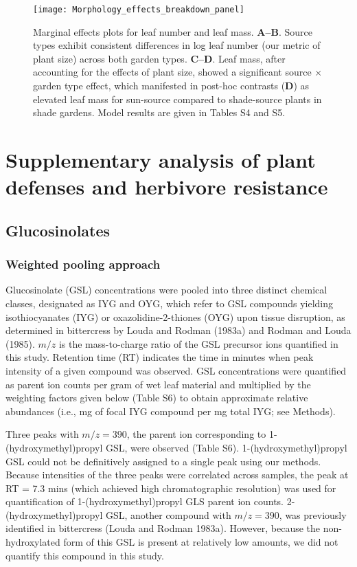\documentclass[11pt, oneside]{amsart}
\begin{document}
\begin{figure}[!htbp]
\centering
\texttt{[image: Morphology\_effects\_breakdown\_panel]}
\caption{Marginal effects plots for leaf number and leaf mass. \textbf{A--B}. Source types exhibit consistent differences in log leaf number (our metric of plant size) across both garden types. \textbf{C--D}. Leaf mass, after accounting for the effects of plant size, showed a significant source $\times$ garden type effect, which manifested in post-hoc contrasts (\textbf{D}) as elevated leaf mass for sun-source compared to shade-source plants in shade gardens. Model results are given in Tables S4 and S5.}
\label{FigS8}
\end{figure}

\clearpage

\section{Supplementary analysis of plant defenses and herbivore resistance}
\subsection{Glucosinolates}
\subsubsection{Weighted pooling approach}
Glucosinolate (GSL) concentrations were pooled into three distinct chemical classes, designated as IYG and OYG, which refer to GSL compounds yielding isothiocyanates (IYG) or oxazolidine-2-thiones (OYG) upon tissue disruption, as determined in bittercress by Louda and Rodman (1983a) and Rodman and Louda (1985). $m/z$ is the mass-to-charge ratio of the GSL precursor ions quantified in this study. Retention time (RT) indicates the time in minutes when peak intensity of a given compound was observed. GSL concentrations were quantified as parent ion counts per gram of wet leaf material and multiplied by the weighting factors given below (Table S6) to obtain approximate relative abundances (i.e., mg of focal IYG compound per mg total IYG; see Methods).

Three peaks with  $m/z = 390$, the parent ion corresponding to 1-(hydroxymethyl)propyl GSL, were observed (Table S6). 1-(hydroxymethyl)propyl GSL could not be definitively assigned to a single peak using our methods. Because intensities of the three peaks were correlated across samples, the peak at RT = 7.3 mins (which achieved high chromatographic resolution) was used for quantification of 1-(hydroxymethyl)propyl GLS parent ion counts. 2-(hydroxymethyl)propyl GSL, another compound with $m/z = 390$, was previously identified in bittercress (Louda and Rodman 1983a). However, because the non-hydroxylated form of this GSL is present at relatively low amounts, we did not quantify this compound in this study.
\end{document}
